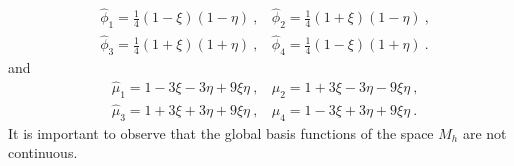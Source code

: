 \documentclass[preprint,12pt,authoryear]{elsarticle}
\begin{document}
%
\begin{equation}
\begin{split}
&\hat{\phi}_{1}=\frac{1}{4}(1-\xi)(1-\eta) \:, \:\:\:\: \hat{\phi}_{2}=\frac{1}{4}(1+\xi)(1-\eta) \:,\\
&\hat{\phi}_{3}=\frac{1}{4}(1+\xi)(1+\eta) \:, \:\:\:\: \hat{\phi}_{4}=\frac{1}{4}(1-\xi)(1+\eta) \:.
\end{split}
\end{equation}   
and
\begin{equation}
\begin{split}
&\hat{\mu}_{1} = 1 - 3\xi - 3\eta + 9\xi\eta \:, \:\:\:\: 
\hat{\mu}_{2} = 1 + 3\xi - 3\eta - 9\xi\eta \:,\\
&\hat{\mu}_{3} = 1 + 3\xi + 3\eta + 9\xi\eta \:, \:\:\:\: 
\hat{\mu}_{4} = 1 - 3\xi + 3\eta + 9\xi\eta \:.
\end{split}
\end{equation}
It is important to observe that the global basis functions of the space $M_{h}$ are not continuous.
\end{document}
